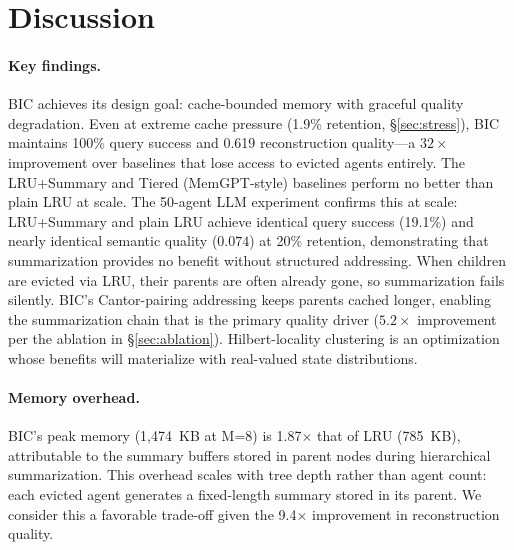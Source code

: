 
\section{Discussion}
\label{sec:discussion}

\paragraph{Key findings.}
BIC achieves its design goal: cache-bounded memory with graceful quality
degradation.  Even at extreme cache pressure (1.9\% retention,
\S\ref{sec:stress}), BIC maintains 100\% query success and 0.619
reconstruction quality---a $32\times$ improvement over baselines
that lose access to evicted agents entirely.  The LRU+Summary and
Tiered (MemGPT-style) baselines perform no better than plain LRU at
scale.  The 50-agent LLM experiment confirms this at scale: LRU+Summary
and plain LRU achieve identical query success (19.1\%) and nearly
identical semantic quality ($0.074$) at 20\% retention, demonstrating
that summarization provides no benefit without structured addressing.
When children are evicted via LRU, their parents are often
already gone, so summarization fails silently.  BIC's Cantor-pairing
addressing keeps parents cached longer, enabling the summarization
chain that is the primary quality driver ($5.2\times$ improvement
per the ablation in \S\ref{sec:ablation}).  Hilbert-locality
clustering is an optimization whose benefits will materialize with
real-valued state distributions.

\paragraph{Memory overhead.}
BIC's peak memory (1,474~KB at M=8) is 1.87$\times$ that of LRU (785~KB), attributable to the summary buffers stored in parent nodes during hierarchical summarization. This overhead scales with tree depth rather than agent count: each evicted agent generates a fixed-length summary stored in its parent. We consider this a favorable trade-off given the 9.4$\times$ improvement in reconstruction quality.

